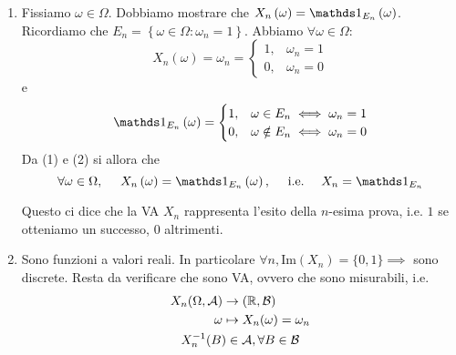\begin{enumerate}
\item Fissiamo $\omega \in \Omega $. Dobbiamo mostrare che $X_{n}\left(\omega \right) =\Ind_{E_{n}}\left(\omega \right)$. Ricordiamo che $E_{n} =\left\{\omega \in \Omega :\omega_{n} =1\right\}$. Abbiamo $\forall \omega \in \Omega $:
\begin{equation}
X_{n}\left(\omega \right) =\omega_{n} =
\begin{cases}
1, & \omega_{n} =1\\
0, & \omega_{n} =0
\end{cases}
\end{equation}
e
\begin{equation}
\Ind_{E_{n}}\left(\omega \right) =
\begin{cases}
1, & \omega \in E_{n} \iff \omega_{n} =1\\
0, & \omega \notin E_{n} \iff \omega_{n} =0
\end{cases}
\end{equation}
Da (1) e (2) si allora che
\begin{equation*}
\forall \omega \in \Omega ,\ \ \ \ X_{n}\left(\omega \right) =\Ind_{E_{n}}\left(\omega \right) ,\ \ \ \ \text{i.e.} \ \ \ \ X_{n} =\Ind_{E_{n}}
\end{equation*}

\begin{oss}
Questo ci dice che la VA $X_{n}$ rappresenta l'esito della $n$-esima prova, i.e. $1$ se otteniamo un successo, $0$ altrimenti.
\end{oss}
\item Sono funzioni a valori reali. In particolare $\forall n,\mathrm{Im}(X_{n}) =\{0,1\} \implies $ sono discrete. Resta da verificare che sono VA, ovvero che sono misurabili, i.e.
\begin{gather*}
\begin{aligned}
X_{n}(\Omega ,\mathcal{A}) & \rightarrow (\mathbb{R} ,\mathcal{B})\\
\omega  & \mapsto X_{n}(\omega) =\omega_{n}
\end{aligned}\\
X_{n}^{-1}(B) \in \mathcal{A} ,\forall B\in \mathcal{B}
\end{gather*}


\end{enumerate}
